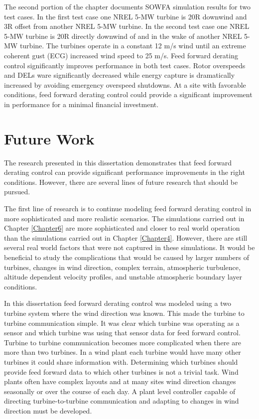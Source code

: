 The second portion of the chapter documents SOWFA simulation results for two test cases. In the first test case one NREL 5-MW turbine is 20R downwind and 3R offset from another NREL 5-MW turbine. In the second test case one NREL 5-MW turbine is 20R directly downwind of and in the wake of another NREL 5-MW turbine. The turbines operate in a constant 12 m/s wind until an extreme coherent gust (ECG) increased wind speed to 25 m/s. Feed forward derating control significantly improves performance in both test cases. Rotor overspeeds and DELs ware significantly decreased while energy capture is dramatically increased by avoiding emergency overspeed shutdowns.  At a site with favorable conditions, feed forward derating control could provide a significant improvement in performance for a minimal financial investment.



\section{Future Work}

The research presented in this dissertation demonstrates that feed forward derating control can provide significant performance improvements in the right conditions. However, there are several lines of future research that should be pursued. 

The first line of research is to continue modeling feed forward derating control in more sophisticated and more realistic scenarios. The simulations carried out in Chapter \ref{Chapter6} are more sophisticated and closer to real world operation than the simulations carried out in Chapter \ref{Chapter4}. However, there are still several real world factors that were not captured in these simulations. It would be beneficial to study the complications that would be caused by larger numbers of turbines, changes in wind direction, complex terrain, atmospheric turbulence, altitude dependent velocity profiles, and unstable atmospheric boundary layer conditions.

In this dissertation feed forward derating control was modeled using a two turbine system where the wind direction was known. This made the turbine to turbine communication simple. It was clear which turbine was operating as a sensor and which turbine was using that sensor data for feed forward control. Turbine to turbine communication becomes more complicated when there are more than two turbines. In a wind plant each turbine would have many other turbines it could share information with. Determining which turbines should provide feed forward data to which other turbines is not a trivial task. Wind plants often have complex layouts and at many sites wind direction changes seasonally or over the course of each day. A plant level controller capable of directing turbine-to-turbine communication and adapting to changes in wind direction must be developed. 

